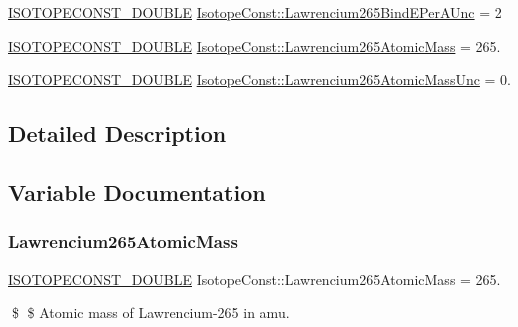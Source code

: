 \begin{DoxyCompactItemize}
\mbox{\hyperlink{group___isotope_const-_macros_ga8f45a7272ce02c0b4c65c44636ed719a}{I\+S\+O\+T\+O\+P\+E\+C\+O\+N\+S\+T\+\_\+\+D\+O\+U\+B\+LE}} \mbox{\hyperlink{group___isotope_const-_lawrencium-_lr265_ga8abb9e6e74febb3af1fc84a9d7077884}{Isotope\+Const\+::\+Lawrencium265\+Bind\+E\+Per\+A\+Unc}} = 2
\item 
\mbox{\hyperlink{group___isotope_const-_macros_ga8f45a7272ce02c0b4c65c44636ed719a}{I\+S\+O\+T\+O\+P\+E\+C\+O\+N\+S\+T\+\_\+\+D\+O\+U\+B\+LE}} \mbox{\hyperlink{group___isotope_const-_lawrencium-_lr265_ga52549c5b6c23ad6e22d291b32745c1e7}{Isotope\+Const\+::\+Lawrencium265\+Atomic\+Mass}} = 265.
\item 
\mbox{\hyperlink{group___isotope_const-_macros_ga8f45a7272ce02c0b4c65c44636ed719a}{I\+S\+O\+T\+O\+P\+E\+C\+O\+N\+S\+T\+\_\+\+D\+O\+U\+B\+LE}} \mbox{\hyperlink{group___isotope_const-_lawrencium-_lr265_gac32d41caf55e24f70ffac7463b93dd51}{Isotope\+Const\+::\+Lawrencium265\+Atomic\+Mass\+Unc}} = 0.
\end{DoxyCompactItemize}


\subsection{Detailed Description}


\subsection{Variable Documentation}
\mbox{\label{group___isotope_const-_lawrencium-_lr265_ga52549c5b6c23ad6e22d291b32745c1e7}} 
\subsubsection{\texorpdfstring{Lawrencium265\+Atomic\+Mass}{Lawrencium265AtomicMass}}
{\footnotesize\ttfamily \mbox{\hyperlink{group___isotope_const-_macros_ga8f45a7272ce02c0b4c65c44636ed719a}{I\+S\+O\+T\+O\+P\+E\+C\+O\+N\+S\+T\+\_\+\+D\+O\+U\+B\+LE}} Isotope\+Const\+::\+Lawrencium265\+Atomic\+Mass = 265.}

\$ \$ Atomic mass of Lawrencium-\/265 in amu. \mbox{\label{group___isotope_const-_lawrencium-_lr265_gac32d41caf55e24f70ffac7463b93dd51}} 
